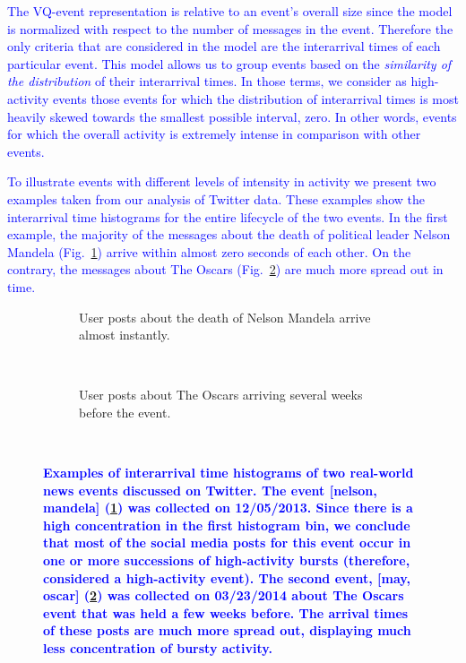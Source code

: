 \documentclass[10pt,letterpaper]{article}
\begin{document}
\textcolor{blue}{The VQ-event representation is relative to an event's overall size
since the model is normalized with respect to the number of messages in the
event. Therefore the only criteria that are considered in the model are the
interarrival times of each particular event. This model allows us to group events based on the
{\em similarity of the distribution} of their interarrival times.
In those terms, we consider as high-activity events those events for which
the distribution of interarrival times is most heavily
skewed towards the smallest possible interval, zero.  In other words,
events for which the overall activity is extremely intense in comparison
with other events.}

\textcolor{blue}{To illustrate events with different levels of intensity in activity we
present two examples taken from our analysis of Twitter data. These
examples show the interarrival time histograms for the entire lifecycle of
the two events. In
the first example, the majority of the messages about
the death of political leader Nelson Mandela
(Fig.~\ref{fig:fig1a}) arrive within almost zero seconds of
each other. On the contrary, the messages about The Oscars
(Fig.~\ref{fig:fig1b}) are much more spread out in time.}
\begin{figure}
  \centering
  \begin{subfigure}{\textwidth}
    \caption{User posts about the death of Nelson Mandela arrive
      almost instantly.}
    \label{fig:fig1a}
  \end{subfigure}%

  ~ %
  \begin{subfigure}{\textwidth}
    \caption{User posts about The Oscars arriving several weeks before
      the event.}
    \label{fig:fig1b}
  \end{subfigure}%
  ~ %

  \caption{\textbf{\textcolor{blue}{Examples of interarrival time histograms of two real-world news
events discussed on Twitter. The event [nelson, mandela] (\ref{fig:fig1a}) was
      collected on 12/05/2013. Since there is a high
      concentration in the first histogram bin, we conclude that most of the social media posts
      for this event occur in one or more successions of high-activity
      bursts (therefore, considered a high-activity event).
      The second event, [may, oscar] (\ref{fig:fig1b}) was collected
      on 03/23/2014 about The Oscars event that was held a few
      weeks before. The arrival times of these posts are much more spread
      out, displaying much less concentration of bursty activity.} }
  }
  \label{fig:fig1}
\end{figure}
\end{document}
